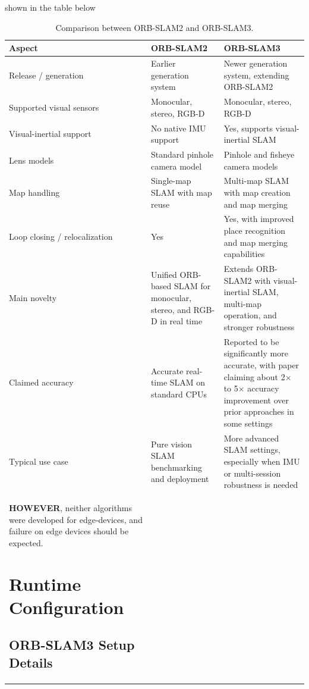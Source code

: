\documentclass[11pt]{article}
\begin{document}
shown in the table below
\begin{table}[ht]
\centering
\caption{Comparison between ORB-SLAM2 and ORB-SLAM3.}
\label{tab:orbslam2_vs_orbslam3}
\renewcommand{\arraystretch}{1.2}
\setlength{\tabcolsep}{5pt}
\begin{tabular}{p{3.2cm}p{5.2cm}p{5.2cm}}
\toprule
\textbf{Aspect} & \textbf{ORB-SLAM2} & \textbf{ORB-SLAM3} \\
\midrule
Release / generation
& Earlier generation system
& Newer generation system, extending ORB-SLAM2 \\
\midrule
Supported visual sensors
& Monocular, stereo, RGB-D
& Monocular, stereo, RGB-D \\
\midrule
Visual-inertial support
& No native IMU support
& Yes, supports visual-inertial SLAM \\
\midrule
Lens models
& Standard pinhole camera model
& Pinhole and fisheye camera models \\
\midrule
Map handling
& Single-map SLAM with map reuse
& Multi-map SLAM with map creation and map merging \\
\midrule
Loop closing / relocalization
& Yes
& Yes, with improved place recognition and map merging capabilities \\
\midrule
Main novelty
& Unified ORB-based SLAM for monocular, stereo, and RGB-D in real time
& Extends ORB-SLAM2 with visual-inertial SLAM, multi-map operation, and stronger robustness \\
\midrule
Claimed accuracy
& Accurate real-time SLAM on standard CPUs
& Reported to be significantly more accurate, with paper claiming about 2$\times$ to 5$\times$ accuracy improvement over prior approaches in some settings \\
\midrule
Typical use case
& Pure vision SLAM benchmarking and deployment
& More advanced SLAM settings, especially when IMU or multi-session robustness is needed \\
\bottomrule

\textbf{HOWEVER}, neither algorithms were developed for edge-devices, and failure on edge devices should be expected.
\section{Runtime Configuration}

\subsection{ORB-SLAM3 Setup Details}



\end{tabular}
\end{table}
\end{document}
